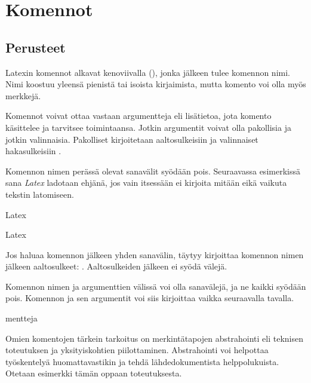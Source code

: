 \section{Komennot}
\label{luku:komennot}

\subsection{Perusteet}

Latexin komennot alkavat kenoviivalla (\koodi{\textbackslash}), jonka
jälkeen tulee komennon nimi. Nimi koostuu yleensä pienistä tai isoista
kirjaimista, mutta komento voi olla myös merkkejä.

Komennot voivat ottaa vastaan argumentteja eli lisätietoa, jota komento
käsittelee ja tarvitsee toimintaansa. Jotkin argumentit voivat olla
pakollisia ja jotkin valinnaisia. Pakolliset kirjoitetaan
aaltosulkeisiin \koodi{\{\ldots\}} ja valinnaiset hakasulkeisiin
\koodi{[\ldots]}.

\begin{koodilohkosis}
  \komento
\end{koodilohkosis}

Komennon nimen perässä olevat sanavälit syödään pois. Seuraavassa
esimerkissä sana \emph{Latex} ladotaan ehjänä, jos vain  itsessään ei kirjoita mitään eikä vaikuta tekstin latomiseen.

\pagebreak[3]

\begin{koodilohkosis}
  La\komento   tex
\end{koodilohkosis}

\begin{tulossis}
  Latex
\end{tulossis}

Jos haluaa komennon jälkeen yhden sanavälin, täytyy kirjoittaa komennon
nimen jälkeen aaltosulkeet: . Aaltosulkeiden
jälkeen ei syödä välejä.

Komennon nimen ja argumenttien välissä voi olla sanavälejä, ja ne kaikki
syödään pois. Komennon ja sen argumentit voi siis kirjoittaa vaikka
seuraavalla tavalla.

\begin{koodilohkosis}
     {mentteja}
\end{koodilohkosis}

Omien komentojen tärkein tarkoitus on merkintätapojen abstrahointi eli
teknisen toteutuksen ja yksityiskohtien piilottaminen. Abstrahointi voi
helpottaa työskentelyä huomattavastikin ja tehdä lähdedokumentista
helppolukuista. Otetaan esimerkki tämän oppaan toteutuksesta.

